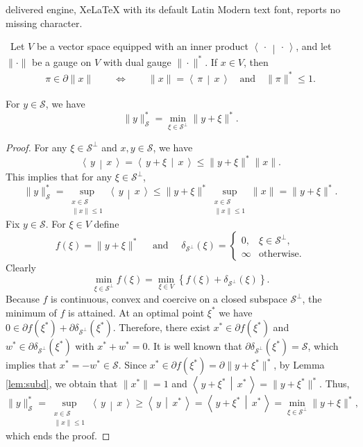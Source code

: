 \documentclass[10pt,a4paper]{amsart}
\newcommand{\scalar}[2]{\left\langle\,#1\,\middle|\,#2\,\right\rangle}
\renewcommand{\SS}{\mathcal{S}}
\begin{document}
delivered engine, XeLaTeX with its default Latin Modern text font, reports no missing character.
\begin{lemma}\label{lem:subd}\ 
 Let $V$ be a vector space equipped with an inner product $\scalar{\cdot}{\cdot}$, and let $\|\cdot\|$ be a gauge on $V$ with dual gauge  $\|\cdot\|^\ast$. If $x\in V$, then 
    \begin{align*}
  \pi \in \partial\|x\|\qquad\iff\qquad     \|x\|=\scalar{\pi}{x} \quad
	\mbox{and}\quad \|\pi\|^\ast\leq 1.
    \end{align*}
\end{lemma}

\begin{lemma}
	For $y\in\SS$, we have
	\[
	\|y\|_\SS^\ast = \min_{\xi\in \SS^\bot} \|y+\xi\|^\ast. 
	\]
\end{lemma}

\begin{proof}
	For any $\xi\in\SS^\bot$ and $x, y\in\SS$, we have 
	\[
	\scalar{y}{x} = \scalar{y+\xi}{x}\leq \|y+\xi\|^\ast \|x\|.
	\]
	This implies that for any $\xi\in \SS^\bot$,
	\[
	\|y\|_\SS^\ast = \sup_{\substack{x\in \SS\\\|x\|\leq 1}}  \scalar{y}{x} \leq \|y+\xi\|^\ast \sup_{\substack{x\in \SS\\\|x\|\leq 1}} \|x\|  = \|y+\xi\|^\ast.
	\]
	Fix $y\in\SS$. For $\xi\in V$ define 
	\[
	f(\xi)=\|y+\xi\|^\ast\quad \mbox{ and }\quad\delta_{\SS^\bot}(\xi) = \begin{cases} 0, & \xi \in \SS^\bot, \\ \infty & \mbox{otherwise}.\end{cases}
	\]
	Clearly 
	\[
	\min_{\xi\in\SS^\bot} f(\xi) = \min_{\xi\in V} \left\{ f(\xi)+\delta_{\SS^\bot}(\xi)\right\}.
	\]
	Because $f$ is continuous, convex and coercive on a closed subspace $\SS^\bot$, the minimum of $f$ is attained. 
	At an optimal point $\xi^\ast$ we have
	$0\in \partial f(\xi^\ast)+\partial\delta_{\SS^\bot}(\xi^\ast)$. Therefore, there exist $x^\ast\in \partial f(\xi^\ast)$ and $w^\ast\in \partial\delta_{\SS^\bot}(\xi^\ast)$ with $x^\ast+w^\ast=0$.  It is well known that $\partial\delta_{\SS^\bot}(\xi^\ast)=\SS$, which implies that $x^\ast=-w^\ast\in\SS$. Since $x^\ast\in \partial f(\xi^\ast)=\partial \|y+\xi^\ast\|^\ast$, by Lemma \ref{lem:subd}, we obtain that $\|x^\ast\|= 1$ and 
	$\scalar{y+\xi^\ast}{x^\ast} = \|y+\xi^\ast\|^\ast$.    Thus, 
	\[
	\|y\|_\SS^\ast = \sup_{\substack{x\in \SS\\\|x\|\leq 1}}  \scalar{y}{x} \geq \scalar{y}{x^\ast} = \scalar{y+\xi^\ast}{x^\ast}=\min_{\xi\in\SS^\bot}\|y+\xi\|^\ast,
	\]
	which ends the proof.
\end{proof}
\end{document}
